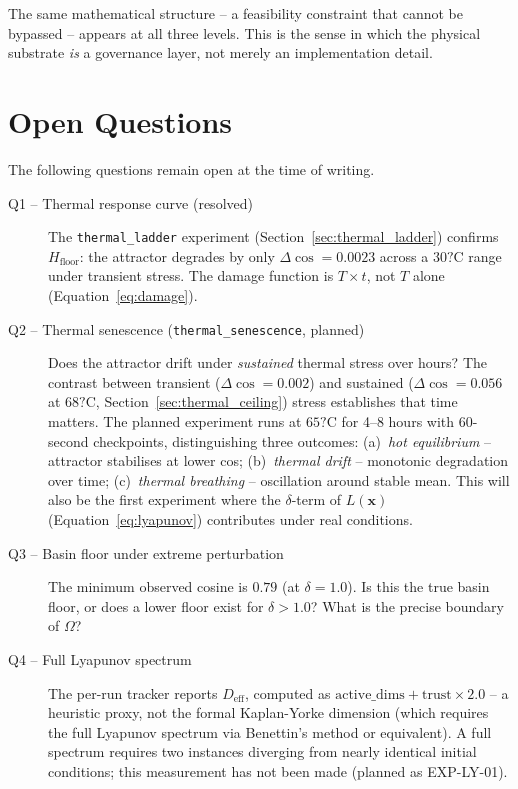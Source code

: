 \documentclass[11pt, a4paper]{article}
\newcommand{\sv}{\bm{x}}
\begin{document}
The same mathematical structure -- a feasibility constraint that cannot
be bypassed -- appears at all three levels.
This is the sense in which the physical substrate \emph{is} a governance
layer, not merely an implementation detail.


\section{Open Questions}
\label{sec:openq}

The following questions remain open at the time of writing.

\begin{description}

  \item[Q1 -- Thermal response curve (resolved)]
    The \texttt{thermal\_ladder} experiment (Section~\ref{sec:thermal_ladder})
    confirms $H_\text{floor}$: the attractor degrades by only $\Delta\cos = 0.0023$
    across a $30?\mathrm{C}$ range under transient stress.
    The damage function is $T \times t$, not $T$ alone (Equation~\ref{eq:damage}).

  \item[Q2 -- Thermal senescence (\texttt{thermal\_senescence}, planned)]
    Does the attractor drift under \emph{sustained} thermal stress over hours?
    The contrast between transient ($\Delta\cos = 0.002$) and sustained
    ($\Delta\cos = 0.056$ at $68?\mathrm{C}$, Section~\ref{sec:thermal_ceiling})
    stress establishes that time matters.
    The planned experiment runs at $65?\mathrm{C}$ for 4--8 hours with
    60-second checkpoints, distinguishing three outcomes:
    (a)~\emph{hot equilibrium} -- attractor stabilises at lower cos;
    (b)~\emph{thermal drift} -- monotonic degradation over time;
    (c)~\emph{thermal breathing} -- oscillation around stable mean.
    This will also be the first experiment where the $\delta$-term of
    $L(\sv)$ (Equation~\ref{eq:lyapunov}) contributes under real conditions.

  \item[Q3 -- Basin floor under extreme perturbation]
    The minimum observed cosine is $0.79$ (at $\delta = 1.0$).
    Is this the true basin floor, or does a lower floor exist for
    $\delta > 1.0$?
    What is the precise boundary of $\Omega$?

  \item[Q4 -- Full Lyapunov spectrum]
    The per-run tracker reports $D_\text{eff}$, computed as
    $\text{active\_dims} + \text{trust} \times 2.0$ -- a heuristic proxy,
    not the formal Kaplan-Yorke dimension (which requires the full Lyapunov
    spectrum via Benettin's method or equivalent).
    A full spectrum requires two instances diverging from nearly identical
    initial conditions; this measurement has not been made (planned as EXP-LY-01).


\end{description}
\end{document}
